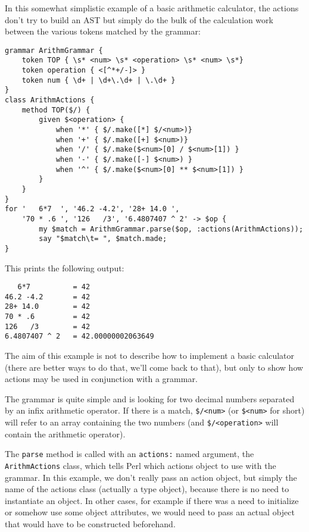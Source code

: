 In this somewhat simplistic example of a basic arithmetic  
calculator, the actions don't try to build an AST but simply 
do the bulk of the calculation work between the various tokens
matched by the grammar:

\begin{verbatim}
grammar ArithmGrammar {
    token TOP { \s* <num> \s* <operation> \s* <num> \s*}
    token operation { <[^*+/-]> }
    token num { \d+ | \d+\.\d+ | \.\d+ }
}
class ArithmActions {
    method TOP($/) {
        given $<operation> {
            when '*' { $/.make([*] $/<num>)}
            when '+' { $/.make([+] $<num>)}
            when '/' { $/.make($<num>[0] / $<num>[1]) }
            when '-' { $/.make([-] $<num>) }
            when '^' { $/.make($<num>[0] ** $<num>[1]) }
        }
    }
}
for '   6*7  ', '46.2 -4.2', '28+ 14.0 ',
    '70 * .6 ', '126   /3', '6.4807407 ^ 2' -> $op {
        my $match = ArithmGrammar.parse($op, :actions(ArithmActions));
        say "$match\t= ", $match.made;
}
\end{verbatim}

This prints the following output:

\begin{verbatim}
   6*7          = 42
46.2 -4.2       = 42
28+ 14.0        = 42
70 * .6         = 42
126   /3        = 42
6.4807407 ^ 2   = 42.00000002063649
\end{verbatim}

The aim of this example is not to describe how to implement 
a basic calculator (there are better ways to do that, we'll 
come back to that), but only to show how actions may be 
used in conjunction with a grammar.

The grammar is quite simple and is looking for two decimal numbers 
separated by an infix arithmetic operator. If there is a 
match, \verb'$/<num>' (or \verb'$<num>' for short) will refer to an 
array containing the two numbers (and \verb'$/<operation>' 
will contain the arithmetic operator).

The {\tt parse} 
method is called with an {\tt actions:} named argument, 
the {\tt ArithmActions} class, which tells Perl which 
actions object to use with the grammar. In this example, we 
don't really pass an action object, but simply the name 
of the actions class (actually a type object), 
because there is no need to instantiate an object. In 
other cases, for example if there was a need to initialize 
or somehow use some object attributes, we would need to pass 
an actual object that would have to be constructed beforehand.

